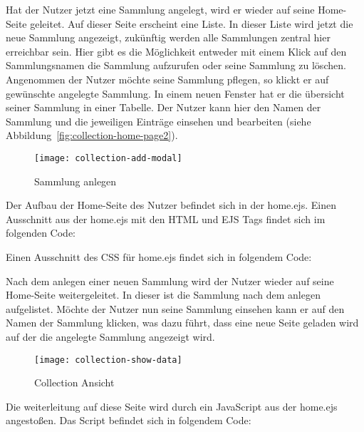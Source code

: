 Hat der Nutzer jetzt eine Sammlung angelegt, wird er wieder auf seine Home-Seite geleitet.
Auf dieser Seite erscheint eine Liste.
In dieser Liste wird jetzt die neue Sammlung angezeigt, zukünftig werden alle Sammlungen zentral hier erreichbar sein.
Hier gibt es die Möglichkeit entweder mit einem Klick auf den Sammlungsnamen die Sammlung aufzurufen oder seine Sammlung zu löschen.
Angenommen der Nutzer möchte seine Sammlung pflegen, so klickt er auf gewünschte angelegte Sammlung.
In einem neuen Fenster hat er die übersicht seiner Sammlung in einer Tabelle.
Der Nutzer kann hier den Namen der Sammlung und die jeweiligen Einträge einsehen und bearbeiten (siehe Abbildung~\ref{fig:collection-home-page2}).
\newpage
\begin{figure}[h]
    \centering
    \texttt{[image: collection-add-modal]}
    \caption{Sammlung anlegen}
    \label{fig:collection-add-modal}
\end{figure}

Der Aufbau der Home-Seite des Nutzer befindet sich in der home.ejs.
Einen Ausschnitt aus der home.ejs mit den HTML und EJS Tags findet sich im folgenden Code:

\vspace{1em}

\vspace{1em}

Einen Ausschnitt des CSS für home.ejs findet sich in folgendem Code:

\vspace{1em}

\vspace{1em}

Nach dem anlegen einer neuen Sammlung wird der Nutzer wieder auf seine Home-Seite weitergeleitet.
In dieser ist die Sammlung nach dem anlegen aufgelistet.
Möchte der Nutzer nun seine Sammlung einsehen kann er auf den Namen der Sammlung klicken, was dazu führt, dass eine neue Seite geladen wird auf der die angelegte Sammlung angezeigt wird.

\begin{figure}[h]
    \centering
    \texttt{[image: collection-show-data]}
    \caption{Collection Ansicht}
    \label{fig:collection-show-data}
\end{figure}

Die weiterleitung auf diese Seite wird durch ein JavaScript aus der home.ejs angestoßen.
Das Script befindet sich in folgendem Code:


